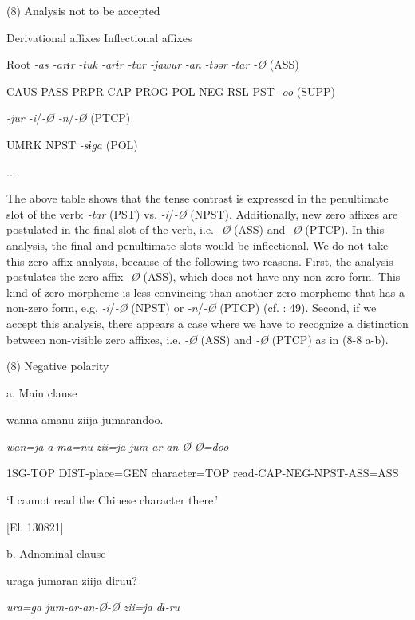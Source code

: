 (8)  Analysis not to be accepted

    Derivational affixes  Inflectional affixes

  Root  \textit{{}-as  {}-arɨr} %
\textit{{}-tuk  {}-arɨr  {}-tur  {}-jawur} %
\textit{{}-an} %
\textit{{}-təər} %
\textit{{}-tar  {}-Ø} (ASS)

    CAUS  PASS  PRPR  CAP  PROG  POL  NEG  RSL  PST  \textit{{}-oo} (SUPP)

          \textit{{}-jur    {}-i}/\textit{{}-Ø  {}-n}/\textit{{}-Ø} (PTCP)

          UMRK    NPST  \textit{{}-sɨga} (POL)

                ...

The above table shows that the tense contrast is expressed in the penultimate slot of the verb: \textit{{}-tar} (PST) vs. \textit{{}-i}/\textit{{}-Ø} (NPST). Additionally, new zero affixes are postulated in the final slot of the verb, i.e. \textit{{}-Ø} (ASS) and \textit{{}-Ø} (PTCP). In this analysis, the final and penultimate slots would be inflectional. We do not take this zero-affix analysis, because of the following two reasons. First, the analysis postulates the zero affix \textit{{}-Ø} (ASS), which does not have any non-zero form. This kind of zero morpheme is less convincing than another zero morpheme that has a non-zero form, e.g, \textit{{}-i}/\textit{{}-Ø} (NPST) or \textit{{}-n}/\textit{{}-Ø} (PTCP) (cf. \citealt{Haas1974}: 49). Second, if we accept this analysis, there appears a case where we have to recognize a distinction between non-visible zero affixes, i.e. \textit{{}-Ø} (ASS) and \textit{{}-Ø} (PTCP) as in (8-8 a-b).

(8)  Negative polarity

  a.  Main clause

    wanna  amanu  ziija  jumarandoo.

    \textit{wan=ja}  \textit{a-ma=nu}  \textit{zii=ja}  \textit{jum-ar-an-Ø-Ø=doo}

    1SG-TOP  DIST-place=GEN  character=TOP  read-CAP-NEG-NPST-ASS=ASS

    ‘I cannot read the Chinese character there.’

    [El: 130821]

  b.  Adnominal clause

    uraga  jumaran  ziija  dɨruu?

    \textit{ura=ga}  \textit{jum-ar-an-Ø-Ø}  \textit{zii=ja}  \textit{dɨ-ru}

